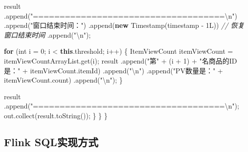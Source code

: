 \documentclass[cn,11pt,chinese]{elegantbook}
\newenvironment{Shaded}{}{}
\newcommand{\BuiltInTok}[1]{#1}
\newcommand{\CommentTok}[1]{\textcolor[rgb]{0.38,0.63,0.69}{\textit{#1}}}
\newcommand{\DataTypeTok}[1]{\textcolor[rgb]{0.56,0.13,0.00}{#1}}
\newcommand{\DecValTok}[1]{\textcolor[rgb]{0.25,0.63,0.44}{#1}}
\newcommand{\FunctionTok}[1]{\textcolor[rgb]{0.02,0.16,0.49}{#1}}
\newcommand{\KeywordTok}[1]{\textcolor[rgb]{0.00,0.44,0.13}{\textbf{#1}}}
\newcommand{\NormalTok}[1]{#1}
\newcommand{\SpecialCharTok}[1]{\textcolor[rgb]{0.25,0.44,0.63}{#1}}
\newcommand{\StringTok}[1]{\textcolor[rgb]{0.25,0.44,0.63}{#1}}
\begin{document}
\begin{Shaded}
\begin{Highlighting}[]
\NormalTok{            result}
\NormalTok{                    .}\FunctionTok{append}\NormalTok{(}\StringTok{"====================================}\SpecialCharTok{\textbackslash{}n}\StringTok{"}\NormalTok{)}
\NormalTok{                    .}\FunctionTok{append}\NormalTok{(}\StringTok{"窗口结束时间："}\NormalTok{)}
\NormalTok{                    .}\FunctionTok{append}\NormalTok{(}\KeywordTok{new} \BuiltInTok{Timestamp}\NormalTok{(timestamp {-} }\DecValTok{1L}\NormalTok{)) }\CommentTok{// 恢复窗口结束时间}
\NormalTok{                    .}\FunctionTok{append}\NormalTok{(}\StringTok{"}\SpecialCharTok{\textbackslash{}n}\StringTok{"}\NormalTok{);}

            \KeywordTok{for}\NormalTok{ (}\DataTypeTok{int}\NormalTok{ i = }\DecValTok{0}\NormalTok{; i \textless{} }\KeywordTok{this}\NormalTok{.}\FunctionTok{threshold}\NormalTok{; i++) \{}
\NormalTok{                ItemViewCount itemViewCount = itemViewCountArrayList.}\FunctionTok{get}\NormalTok{(i);}
\NormalTok{                result}
\NormalTok{                        .}\FunctionTok{append}\NormalTok{(}\StringTok{"第"}\NormalTok{ + (i + }\DecValTok{1}\NormalTok{) + }\StringTok{"名商品的ID是："}\NormalTok{ + itemViewCount.}\FunctionTok{itemId}\NormalTok{)}
\NormalTok{                        .}\FunctionTok{append}\NormalTok{(}\StringTok{"}\SpecialCharTok{\textbackslash{}n}\StringTok{"}\NormalTok{)}
\NormalTok{                        .}\FunctionTok{append}\NormalTok{(}\StringTok{"PV数量是："}\NormalTok{ + itemViewCount.}\FunctionTok{count}\NormalTok{)}
\NormalTok{                        .}\FunctionTok{append}\NormalTok{(}\StringTok{"}\SpecialCharTok{\textbackslash{}n}\StringTok{"}\NormalTok{);}
\NormalTok{            \}}

\NormalTok{            result}
\NormalTok{                    .}\FunctionTok{append}\NormalTok{(}\StringTok{"====================================}\SpecialCharTok{\textbackslash{}n}\StringTok{"}\NormalTok{);}
\NormalTok{            out.}\FunctionTok{collect}\NormalTok{(result.}\FunctionTok{toString}\NormalTok{());}
\NormalTok{        \}}
\NormalTok{    \}}
\NormalTok{\}}
\end{Highlighting}
\end{Shaded}

\hypertarget{flink-sqlux5b9eux73b0ux65b9ux5f0f}{%
\subsection{Flink SQL实现方式}\label{flink-sqlux5b9eux73b0ux65b9ux5f0f}}
\end{document}
